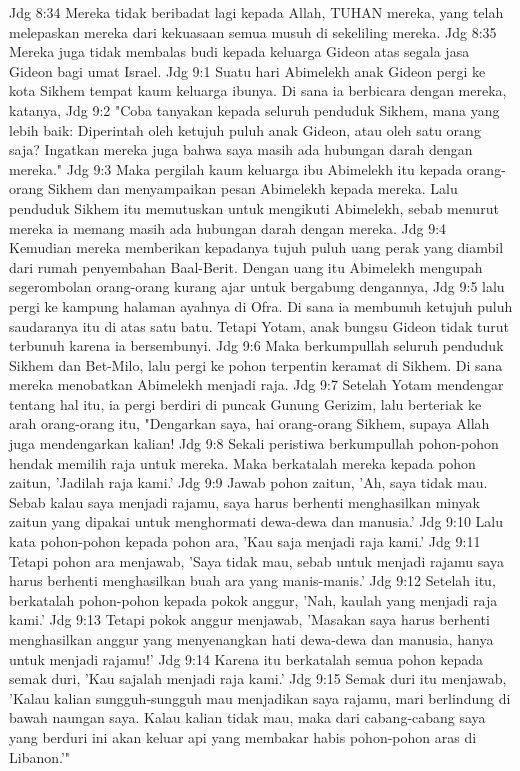 Jdg 8:34  Mereka tidak beribadat lagi kepada Allah, TUHAN mereka, yang telah melepaskan mereka dari kekuasaan semua musuh di sekeliling mereka.
Jdg 8:35  Mereka juga tidak membalas budi kepada keluarga Gideon atas segala jasa Gideon bagi umat Israel.
Jdg 9:1  Suatu hari Abimelekh anak Gideon pergi ke kota Sikhem tempat kaum keluarga ibunya. Di sana ia berbicara dengan mereka, katanya,
Jdg 9:2  "Coba tanyakan kepada seluruh penduduk Sikhem, mana yang lebih baik: Diperintah oleh ketujuh puluh anak Gideon, atau oleh satu orang saja? Ingatkan mereka juga bahwa saya masih ada hubungan darah dengan mereka."
Jdg 9:3  Maka pergilah kaum keluarga ibu Abimelekh itu kepada orang-orang Sikhem dan menyampaikan pesan Abimelekh kepada mereka. Lalu penduduk Sikhem itu memutuskan untuk mengikuti Abimelekh, sebab menurut mereka ia memang masih ada hubungan darah dengan mereka.
Jdg 9:4  Kemudian mereka memberikan kepadanya tujuh puluh uang perak yang diambil dari rumah penyembahan Baal-Berit. Dengan uang itu Abimelekh mengupah segerombolan orang-orang kurang ajar untuk bergabung dengannya,
Jdg 9:5  lalu pergi ke kampung halaman ayahnya di Ofra. Di sana ia membunuh ketujuh puluh saudaranya itu di atas satu batu. Tetapi Yotam, anak bungsu Gideon tidak turut terbunuh karena ia bersembunyi.
Jdg 9:6  Maka berkumpullah seluruh penduduk Sikhem dan Bet-Milo, lalu pergi ke pohon terpentin keramat di Sikhem. Di sana mereka menobatkan Abimelekh menjadi raja.
Jdg 9:7  Setelah Yotam mendengar tentang hal itu, ia pergi berdiri di puncak Gunung Gerizim, lalu berteriak ke arah orang-orang itu, "Dengarkan saya, hai orang-orang Sikhem, supaya Allah juga mendengarkan kalian!
Jdg 9:8  Sekali peristiwa berkumpullah pohon-pohon hendak memilih raja untuk mereka. Maka berkatalah mereka kepada pohon zaitun, 'Jadilah raja kami.'
Jdg 9:9  Jawab pohon zaitun, 'Ah, saya tidak mau. Sebab kalau saya menjadi rajamu, saya harus berhenti menghasilkan minyak zaitun yang dipakai untuk menghormati dewa-dewa dan manusia.'
Jdg 9:10  Lalu kata pohon-pohon kepada pohon ara, 'Kau saja menjadi raja kami.'
Jdg 9:11  Tetapi pohon ara menjawab, 'Saya tidak mau, sebab untuk menjadi rajamu saya harus berhenti menghasilkan buah ara yang manis-manis.'
Jdg 9:12  Setelah itu, berkatalah pohon-pohon kepada pokok anggur, 'Nah, kaulah yang menjadi raja kami.'
Jdg 9:13  Tetapi pokok anggur menjawab, 'Masakan saya harus berhenti menghasilkan anggur yang menyenangkan hati dewa-dewa dan manusia, hanya untuk menjadi rajamu!'
Jdg 9:14  Karena itu berkatalah semua pohon kepada semak duri, 'Kau sajalah menjadi raja kami.'
Jdg 9:15  Semak duri itu menjawab, 'Kalau kalian sungguh-sungguh mau menjadikan saya rajamu, mari berlindung di bawah naungan saya. Kalau kalian tidak mau, maka dari cabang-cabang saya yang berduri ini akan keluar api yang membakar habis pohon-pohon aras di Libanon.'"
